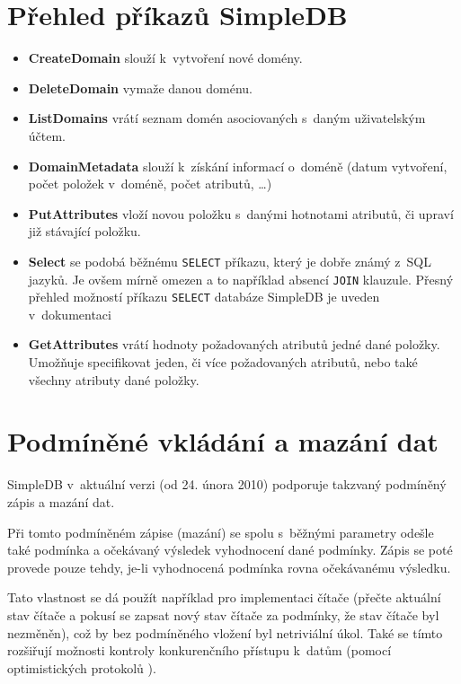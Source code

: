 \documentclass[oneside,12pt]{fithesis2}
\begin{document}
\label{komunikace}
\section{Přehled příkazů SimpleDB}
\begin{itemize}
 \item \textbf{CreateDomain} slouží k~vytvoření nové domény.
 \item \textbf{DeleteDomain} vymaže danou doménu.
 \item \textbf{ListDomains} vrátí seznam domén asociovaných s~daným uživatelským účtem.
 \item \textbf{DomainMetadata} slouží k~získání informací o~doméně (datum vytvoření, počet položek v~doméně, počet atributů, \dots)
 \item \textbf{PutAttributes} vloží novou položku s~danými hotnotami atributů, či upraví již stávající položku.
 \item \textbf{Select} se podobá běžnému \verb<SELECT< příkazu, který je dobře známý z~SQL jazyků. Je ovšem mírně omezen a to například absencí \verb<JOIN< klauzule. Přesný přehled možností příkazu \verb<SELECT< databáze SimpleDB je uveden v~dokumentaci\cite[strana 37, Using Select to Create Amazon SimpleDB Queries]{simpledbDeveloper}
 \item \textbf{GetAttributes} vrátí hodnoty požadovaných atributů jedné dané položky. Umožňuje specifikovat jeden, či více požadovaných atributů, nebo také všechny atributy dané položky.
\end{itemize}

\section{Podmíněné vkládání a mazání dat}
SimpleDB v~aktuální verzi (od 24. února 2010) podporuje takzvaný podmíněný zápis a mazání dat. 

Při tomto podmíněném zápise (mazání) se spolu s~běžnými parametry odešle také podmínka a očekávaný výsledek vyhodnocení dané podmínky. Zápis se poté provede pouze tehdy, je-li vyhodnocená podmínka rovna očekávanému výsledku.

Tato vlastnost se dá použít například pro implementaci čítače (přečte aktuální stav čítače a pokusí se zapsat nový stav čítače za podmínky, že stav čítače byl nezměněn), což by bez podmíněného vložení byl netriviální úkol. Také se tímto rozšiřují možnosti kontroly konkurenčního přístupu k~datům (pomocí optimistických protokolů ).
\end{document}
